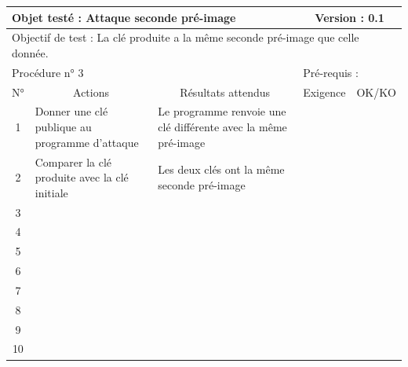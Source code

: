 \documentclass{../res/univ-projet}
\begin{document}
\begin{center}
    \begin{tabular}{|c|p{5cm}|p{5cm}|p{1.5cm}|p{1.5cm}|}
      \hline
      \multicolumn{3}{|l|}{Objet testé : Attaque seconde pré-image} & \multicolumn{2}{c|}{Version : 0.1}\\ \hline
      \multicolumn{5}{|l|}{Objectif de test : La clé produite a la même seconde pré-image que celle donnée.}\\ \hline
      \multicolumn{3}{|l|}{Procédure n° 3} & \multicolumn{2}{p{3cm}|}{Pré-requis : }\\ \hline
      \multicolumn{1}{|c|}{N°} & \multicolumn{1}{c|}{Actions} & \multicolumn{1}{c|}{Résultats attendus} & 
      \multicolumn{1}{c|}{Exigence} & \multicolumn{1}{c|}{OK/KO}\\ \hline
      1 & Donner une clé publique au programme d'attaque & Le programme renvoie une clé différente avec la même pré-image &  & \\
      2 & Comparer la clé produite avec la clé initiale & Les deux clés ont la même seconde pré-image &  & \\
      3 &  &  &  & \\ 
	  4 &  &  &  & \\
      5 &  &  &  & \\
	  6 &  &  &  & \\
      7 &  &  &  & \\
      8 &  &  &  & \\
      9 &  &  &  & \\
      10 &  &  &  &\\ 
	\hline
    \end{tabular}
    \vskip 2.2cm




\end{center}
\end{document}
